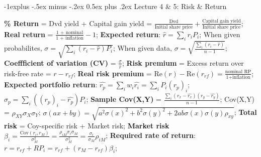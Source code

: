\documentclass[10pt,landscape]{article}
\makeatletter
\renewcommand{\subsection}{\@startsection{subsection}{2}{0mm}%
                                {-1explus -.5ex minus -.2ex}%
                                {0.5ex plus .2ex}%
                                {\normalfont\normalsize\bfseries}}
\makeatother
\begin{document}
\begin{multicols}{3}
\subsection{Lecture 4 \& 5: Risk \& Return}

\textbf{\% Return} = Dvd yield + Capital gain yield = 
$\frac{\text{Dvd}}{\text{Initial share price}} + \frac{\text{Capital gain
yield}}{\text{Initial share price}}$;
\textbf{Real return} = $\frac{\text{1 + nominal}}{\text{1 + inflation}}-1$;
\textbf{Expected return}: $\hat{r} = \sum_i r_i P_i$;
When given probabilites, $\sigma = \sqrt{\sum_i (r_i - \hat{r}) P_i}$;
When given data, $\sigma = \sqrt{\frac{\sum_i (r_i - \hat{r})}{n-1}}$;
\textbf{Coeffficient of variation (CV)} = $\frac{\sigma}{\hat{r}}$;
\textbf{Risk premium} = Excess return over risk-free rate = $r - r_{rf}$;
\textbf{Real risk premium} = $\text{Re}(r) - \text{Re}(r_{rf}) =
\frac{\text{nominal RP}}{\text{1+inflation}}$;
\textbf{Expected portfolio return}: $\hat{r_p} = \sum_i w_i \hat{r_i} = \sum_i
P_i (r_p)_i$;
$\sigma_p = \sum_i ((r_p)_i - \hat{r_p})P_i$;
\textbf{Sample Cov(X,Y)} = $\frac{\sum_i (r_x - \hat{r_x})(r_y - \hat{r_y})}{n-1}$;
Cov(X,Y) = $\rho_{XY} \sigma_X \sigma_Y$;
$\sigma(ax+by) = \sqrt{a^2 \sigma(x)^2 + b^2\sigma(y)^2 +
	2ab\sigma(x)\sigma(y)\rho_{xy}}$;
\textbf{Total risk} = Coy-specific risk + Market risk;
\textbf{Market risk} $\beta_i = \frac{\text{Cov}(r_i, r_M)}{\sigma_M^2}
= \frac{\rho_{iM} \sigma_i \sigma_M}{\sigma_M^2}
= \frac{\sigma_i}{\sigma_M}\rho_{iM}$;
\textbf{Required rate of return}: $r = r_{rf} + RP_i = r_{rf} + (r_M
- r_{rf})\beta_i$;

%
%

\end{multicols}
\end{document}

